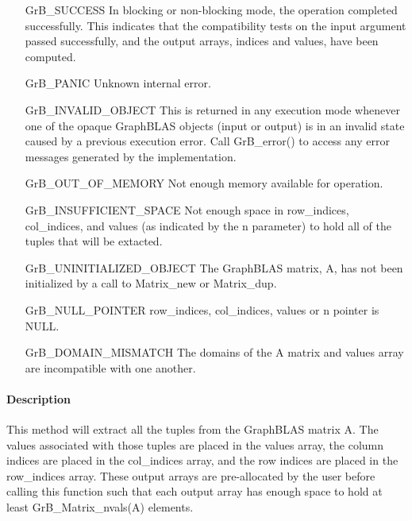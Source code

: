 \begin{itemize}[leftmargin=2.1in]
    \item[{\sf GrB\_SUCCESS}]  In blocking or non-blocking mode, the operation 
    completed successfully. This indicates that the compatibility tests on 
    the input argument passed successfully, and the output arrays, {\sf indices}
    and {\sf values}, have been computed.

    \item[{\sf GrB\_PANIC}]   Unknown internal error.
    
    \item[{\sf GrB\_INVALID\_OBJECT}] This is returned in any execution mode 
    whenever one of the opaque GraphBLAS objects (input or output) is in an invalid 
    state caused by a previous execution error.  Call {\sf GrB\_error()} to access 
    any error messages generated by the implementation.

    \item[{\sf GrB\_OUT\_OF\_MEMORY}]  Not enough memory available for operation.

    \item[{\sf GrB\_INSUFFICIENT\_SPACE}]  Not enough space in {\sf row\_indices}, 
    {\sf col\_indices}, and {\sf values} (as indicated by the {\sf n} parameter) 
    to hold all of the tuples that will be extacted.
    
    \item[{\sf GrB\_UNINITIALIZED\_OBJECT}]  The GraphBLAS matrix, {\sf A}, has 
    not been initialized by a call to {\sf Matrix\_new} or {\sf Matrix\_dup}.
    
    \item[{\sf GrB\_NULL\_POINTER}]  {\sf row\_indices}, {\sf col\_indices}, 
    {\sf values} or {\sf n} pointer is {\sf NULL}.
    
    \item[\sf GrB\_DOMAIN\_MISMATCH] The domains of the {\sf A} matrix and 
    {\sf values} array are incompatible with one another.
\end{itemize}

\paragraph{Description}


This method will extract all the tuples from the GraphBLAS matrix {\sf A}.  
The values associated with those tuples are placed in the
{\sf values} array, the column indices are placed in the {\sf col\_indices} array, 
and the row indices are placed in the {\sf row\_indices} array. 
These output arrays are pre-allocated by the user before calling
this function such that each output array has enough
space to hold at least {\sf GrB\_Matrix\_nvals(A)} elements. 

